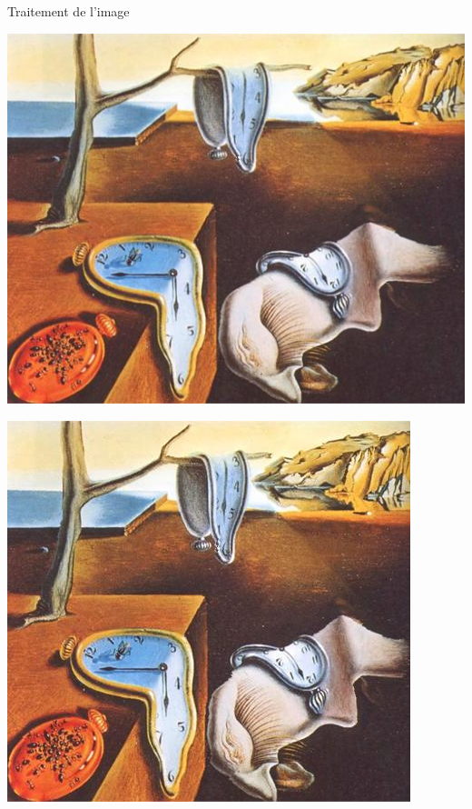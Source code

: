 \documentclass[aspectratio=169]{beamer}
\begin{document}
\begin{frame}[t, c]{Traitement de l'image}{}
\begin{overprint}
    \vfill
    \centering
    \includegraphics[height=.75\textheight]{cropped_img_0002}
    \vfill

    \vfill
    \centering
    \includegraphics[height=.75\textheight]{cropped_img_0001}
    \vfill


\end{overprint}
\end{frame}
\end{document}
